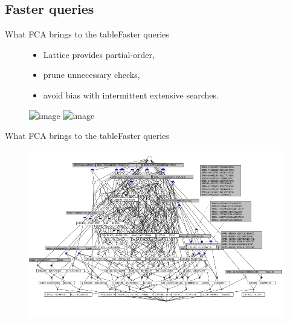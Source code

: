 \subsection{Faster queries}
\begin{frame}{What FCA brings to the table}{Faster queries}

\begin{figure}[ht]
  \begin{minipage}[t]{0.52\linewidth}
    \vspace{0pt}
      \begin{itemize}
      \item Lattice provides partial-order,
      \item prune unnecessary checks,
      \item<2> avoid bias with intermittent extensive searches.
      \end{itemize}
  \end{minipage}
  \hfill
  \begin{minipage}[t]{0.45\linewidth}
    \vspace{0pt}
    \centering
    \includegraphics<1-1>[width=\textwidth]{img/fca/hierarchy1}	
    \includegraphics<2-2>[width=\textwidth]{img/fca/hierarchy2}		
  \end{minipage}
\end{figure}

\end{frame}

\begin{frame}{What FCA brings to the table}{Faster queries}


\begin{figure}[ht]
  \begin{minipage}[t]{0.8\linewidth}
    \vspace{0pt}
    \centering
    \includegraphics[width=\textwidth]{img/fca/lattice1}
  \end{minipage}
  \hfill
  \begin{minipage}[t]{0\linewidth}

  \end{minipage}
\end{figure}

\end{frame}


